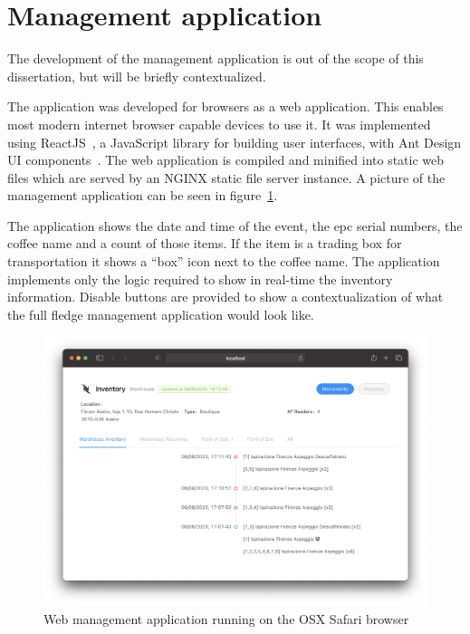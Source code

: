 \section{Management application}

The development of the management application is out of the scope of this dissertation, but will be briefly contextualized.

The application was developed for browsers as a web application. This enables most modern internet browser capable devices to use it.
It was implemented using ReactJS~\cite{ReactJavaScriptLibrary}, a JavaScript library for building user interfaces, with Ant Design UI components~\cite{AntDesignWorld}. The web application is compiled and minified into static web files which are served by an NGINX static file server instance.
A picture of the management application can be seen in figure~\ref{fig:webinterface}.

The application shows the date and time of the event, the \ac{epc} serial numbers, the coffee name and a count of those items. If the item is a trading box for transportation it shows a ``box'' icon next to the coffee name.
The application implements only the logic required to show in real-time the inventory information. Disable buttons are provided to show a contextualization of what the full fledge management application would look like.

\begin{figure}[h]
  \centering
  \includegraphics[width=\textwidth]{figs/webmanagement.png}
  \caption{Web management application running on the OSX Safari browser}
  \label{fig:webinterface}
\end{figure}